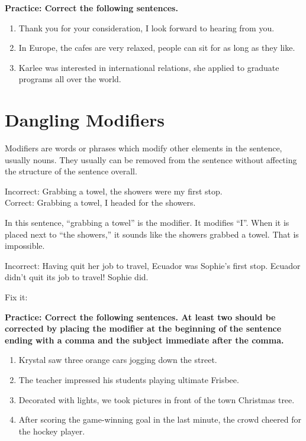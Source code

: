 \documentclass[12pt]{book}
\begin{document}
\bigskip
\textbf{Practice: Correct the following sentences. }
\begin{enumerate}
\item{Thank you for your consideration, I look forward to hearing from you.}
\item{In Europe, the cafes are very relaxed, people can sit for as long as they like.}
\item{Karlee was interested in international relations, she applied to graduate programs all over the world.}
\end{enumerate}

\section{Dangling Modifiers} 
Modifiers are words or phrases which modify other elements in the sentence, usually nouns.  They usually can be removed from the sentence without affecting the structure of the sentence overall.

\bigskip
Incorrect: Grabbing a towel, the showers were my first stop. \\
Correct: Grabbing a towel, I headed for the showers. 

\bigskip
In this sentence, “grabbing a towel” is the modifier.  It modifies “I”.  When it is placed next to “the showers,” it sounds like the showers grabbed a towel.  That is impossible.

\bigskip
Incorrect: Having quit her job to travel, Ecuador was Sophie's first stop.  Ecuador didn't quit its job to travel!  Sophie did.

\bigskip
Fix it: \hrulefill


\bigskip
\textbf{Practice: Correct the following sentences. At least two should be corrected by placing the modifier at the beginning of the sentence ending with a comma and the subject immediate after the comma.}

\begin{enumerate}
\item{Krystal saw three orange cars jogging down the street.}

\item{The teacher impressed his students playing ultimate Frisbee.}

\item{Decorated with lights, we took pictures in front of the town Christmas tree.} 


\item{After scoring the game-winning goal in the last minute, the crowd cheered for the hockey player.}
\end{enumerate}
\end{document}
